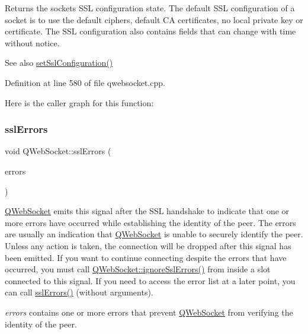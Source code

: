 Returns the socket\textquotesingle{}s S\+SL configuration state. The default S\+SL configuration of a socket is to use the default ciphers, default CA certificates, no local private key or certificate. The S\+SL configuration also contains fields that can change with time without notice.

\begin{DoxySeeAlso}{See also}
\mbox{\hyperlink{class_q_web_socket_a2b47402d89258caa95e46452b698cc3a}{set\+Ssl\+Configuration()}} 
\end{DoxySeeAlso}


Definition at line 580 of file qwebsocket.\+cpp.

Here is the caller graph for this function\+:
\mbox{\label{class_q_web_socket_ae0d3eebd5b595e4e869d2ad6cef45ed7}} 
\subsubsection{\texorpdfstring{ssl\+Errors}{sslErrors}}
{\footnotesize\ttfamily void Q\+Web\+Socket\+::ssl\+Errors (\begin{DoxyParamCaption}\item[{const Q\+List$<$ Q\+Ssl\+Error $>$ \&}]{errors }\end{DoxyParamCaption})\hspace{0.3cm}{\ttfamily [signal]}}

\mbox{\hyperlink{class_q_web_socket}{Q\+Web\+Socket}} emits this signal after the S\+SL handshake to indicate that one or more errors have occurred while establishing the identity of the peer. The errors are usually an indication that \mbox{\hyperlink{class_q_web_socket}{Q\+Web\+Socket}} is unable to securely identify the peer. Unless any action is taken, the connection will be dropped after this signal has been emitted. If you want to continue connecting despite the errors that have occurred, you must call \mbox{\hyperlink{class_q_web_socket_aed580d710b6613a6218a78f4c07fb856}{Q\+Web\+Socket\+::ignore\+Ssl\+Errors()}} from inside a slot connected to this signal. If you need to access the error list at a later point, you can call \mbox{\hyperlink{class_q_web_socket_ae0d3eebd5b595e4e869d2ad6cef45ed7}{ssl\+Errors()}} (without arguments).

{\itshape errors} contains one or more errors that prevent \mbox{\hyperlink{class_q_web_socket}{Q\+Web\+Socket}} from verifying the identity of the peer.

